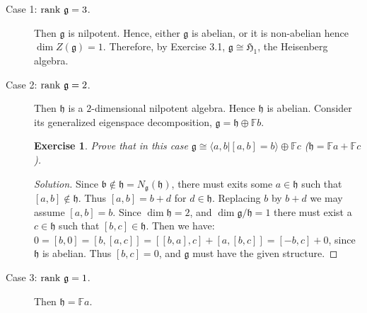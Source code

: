 \documentclass[12pt, fullpage]{article}
\newtheorem{exercise}{Exercise}[section]
\renewcommand{\b}{\mathfrak{b}}
\newcommand{\g}{\mathfrak{g}}
\newcommand{\h}{\mathfrak{h}}
\newcommand{\rank}{{\rm rank\ }}
\newcommand{\F}{\mathbb{F}}
\renewcommand{\H}{\mathfrak{H}}
\newcommand{\Ngh}{N_\g(\h)}
\begin{document}
\begin{description}
\item[Case 1: $\rank\g=3$.]  Then $\g$ is nilpotent.  Hence, either
$\g$ is abelian, or it is non-abelian hence $\dim Z(\g)=1$.
Therefore, by Exercise 3.1, $\g\cong\H_1$, the Heisenberg algebra.
\item[Case 2: $\rank\g=2$.]  Then $\h$ is a $2$-dimensional nilpotent
algebra.  Hence $\h$ is abelian.  Consider its generalized eigenspace
decomposition, $\g=\h\oplus\F b$.

\begin{exercise}
Prove that in this case $\g\cong\langle a,b|[a,b]=b\rangle\oplus \F c$
{\rm (}$\h=\F a+\F c${\rm )}.
\end{exercise}
\begin{proof}[Solution]
Since $\b\not\in\h=\Ngh$, there must exits some $a\in\h$ such that
$[a,b]\not\in\h$.  Thus $[a,b]=b+d$ for $d\in\h$.  Replacing $b$ by
$b+d$ we may assume $[a,b]=b$.  Since $\dim\h=2$, and $\dim\g/\h=1$
there must exist a $c\in\h$ such that $[b,c]\in\h$.  Then we have: $0=
[b,0]= [b,[a,c]]= [[b,a],c]+[a,[b,c]]= [-b,c]+0$, since $\h$ is
abelian.  Thus $[b,c]=0$, and $\g$ must have the given structure.
\end{proof}

\item[Case 3: $\rank\g=1$.]  Then $\h=\F a$.


\end{description}
\end{document}
